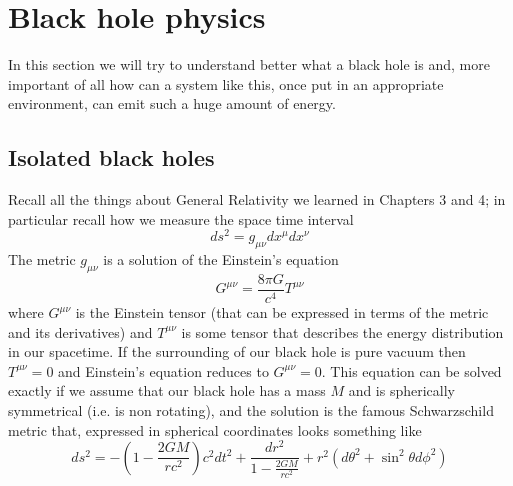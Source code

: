 \section{Black hole physics}
In this section we will try to understand better what a black hole is and, more important of all how can a system like this, once put in an appropriate environment, can emit such a huge amount of energy. 
\subsection{Isolated black holes}
Recall all the things about General Relativity we learned in Chapters 3 and 4; in particular recall how we measure the space time interval
\begin{equation}
ds^2 = g_{\mu\nu}dx^\mu dx^\nu
\end{equation}
The metric $g_{\mu\nu}$ is a solution of the Einstein's equation
\begin{equation}
G^{\mu\nu}=\frac{8\pi G}{c^4}T^{\mu\nu}
\end{equation}
where $G^{\mu\nu}$ is the Einstein tensor (that can be expressed in terms of the metric and its derivatives) and $T^{\mu\nu}$ is some tensor that describes the energy distribution in our spacetime. If the surrounding of our black hole is pure vacuum then $T^{\mu\nu}=0$ and Einstein's equation reduces to $G^{\mu\nu}=0$. This equation can be solved exactly if we assume that our black hole has a mass $M$ and is spherically symmetrical (i.e. is non rotating), and the solution is the famous Schwarzschild metric that, expressed in spherical coordinates looks something like
\begin{equation}
ds^2=-\left(1-\frac{2GM}{rc^2}\right)c^2dt^2 + \frac{dr^2}{1-\frac{2GM}{rc^2}} + r^2(d\theta^2+\sin^2\theta d\phi^2)
\end{equation}

